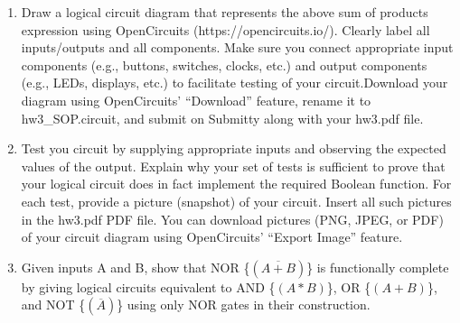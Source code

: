 \documentclass[11pt]{article}
\begin{document}
\begin{enumerate}
\begin{center}
    \end{center}
    \item Draw a logical circuit diagram that represents the above sum of products expression using OpenCircuits (https://opencircuits.io/). Clearly label all inputs/outputs and all
    components. Make sure you connect appropriate input components (e.g., buttons, switches, clocks, etc.) and output components (e.g., LEDs, displays, etc.) to facilitate testing of
    your circuit.Download your diagram using OpenCircuits' “Download” feature, rename it to
    hw3\_SOP.circuit, and submit on Submitty along with your hw3.pdf file.

    \item Test you circuit by supplying appropriate inputs and observing the expected values of the
    output. Explain why your set of tests is sufficient to prove that your logical circuit does in
    fact implement the required Boolean function. For each test, provide a picture (snapshot) of
    your circuit. Insert all such pictures in the hw3.pdf PDF file. You can download pictures
    (PNG, JPEG, or PDF) of your circuit diagram using OpenCircuits' “Export Image” feature.
    
    \item Given inputs A and B, show that NOR \{$(\overline{A + B})$\} is functionally complete by giving logical
    circuits equivalent to AND \{$(A * B)$\}, OR \{$(A + B)$\}, and NOT \{$(\overline{A})$\} using only NOR gates in their construction.
\end{enumerate}
\end{document}

